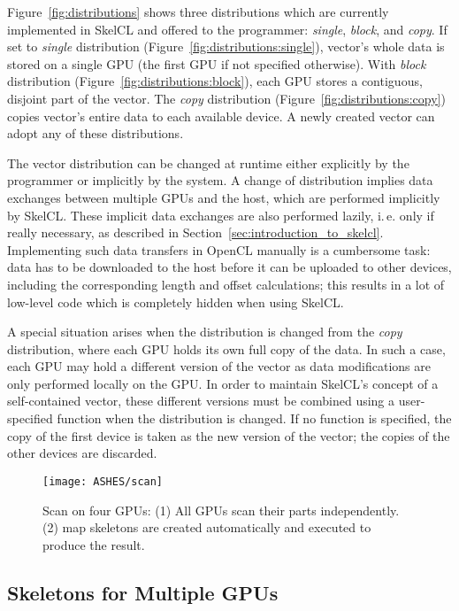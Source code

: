 Figure~\ref{fig:distributions} shows three distributions which are currently implemented in SkelCL and offered to the programmer:
\emph{single}, \emph{block}, and \emph{copy}.
If set to \emph{single} distribution (Figure~\ref{fig:distributions:single}), vector's whole data is stored on a single GPU (the first GPU if not specified otherwise).
With \emph{block} distribution (Figure~\ref{fig:distributions:block}), each GPU stores a contiguous, disjoint part of the vector.
The \emph{copy} distribution (Figure~\ref{fig:distributions:copy}) copies vector's entire data to each available device.
A newly created vector can adopt any of these distributions.

The vector distribution can be changed at runtime either explicitly by the programmer or implicitly by the system.
A change of distribution implies data exchanges between multiple GPUs and the host, which are performed implicitly by SkelCL.
These implicit data exchanges are also performed lazily, i.\,e. only if really necessary, as described in Section~\ref{sec:introduction_to_skelcl}.
Implementing such data transfers in OpenCL manually is a cumbersome task:
data has to be downloaded to the host before it can be uploaded to other devices, including the corresponding length and offset calculations;
this results in a lot of low-level code which is completely hidden when using SkelCL.

A special situation arises when the distribution is changed from the \emph{copy} distribution, where each GPU holds its own full copy of the data.
In such a case, each GPU may hold a different version of the vector as data modifications are only performed locally on the GPU.
In order to maintain SkelCL's concept of a self-contained vector, these different versions must be combined using a user-specified function when the distribution is changed.
If no function is specified, the copy of the first device is taken as the new version of the vector; the copies of the other devices are discarded.

\begin{figure*}[tbp]
    \centering
    \texttt{[image: ASHES/scan]}
    \caption{Scan on four GPUs: (1) All GPUs scan their parts independently.
            (2) map skeletons are created automatically and
             executed to produce the result.}
    \label{fig:scan}
\end{figure*}

\subsection{Skeletons for Multiple GPUs}
\label{sec:multi-gpu_skeletons}

